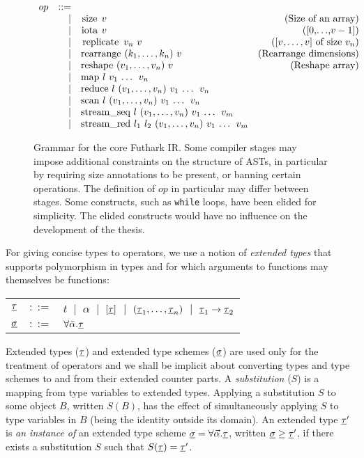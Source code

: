 \begin{figure*}[bt]
$$\begin{array}{lrlr}
    \\
    op & ::= \\
      & | & \mbox{\lstinline{size} $v$} & \mbox{(Size of an array)}\\
      & | & \mbox{\lstinline{iota} $v$} & \mbox{([0,$\ldots$,$v-1$])}\\
      & | & \mbox{\lstinline{replicate} $v_{n}$ $v$} &  \mbox{([$v,\ldots,v$] of size $v_{n}$)}\\
      & | & \mbox{\lstinline{rearrange} ($k_{1},\ldots,k_{n}$) $v$} &  \mbox{(Rearrange dimensions)}\\
      & | & \mbox{\lstinline{reshape} ($v_{1},\ldots,v_{n}$) $v$} &  \mbox{(Reshape array)}\\
      & | & \mbox{\lstinline{map} $l$ $v_{1}$ \ldots{} $v_{n}$} \\
      & | & \mbox{\lstinline{reduce} $l$ ($v_{1},\ldots,v_{n}$) $v_1$ \ldots{} $v_n$} \\
      & | & \mbox{\lstinline{scan} $l$ ($v_{1},\ldots,v_{n}$) $v_1$ \ldots{} $v_n$} \\
      & | & \mbox{\lstinline{stream_seq} $l$ ($v_{1},\ldots,v_{n}$) $v_1$ \ldots{} $v_m$} \\
      & | & \mbox{\lstinline!stream_red! $l_{1}$ $l_{2}$ ($v_{1},\ldots,v_{n}$) $v_1$ \ldots{} $v_m$}
  \end{array}
  $$
  \caption{Grammar for the core Futhark IR.  Some compiler stages may
    impose additional constraints on the structure of ASTs, in
    particular by requiring size annotations to be present, or banning
    certain operations.  The definition of $op$ in particular may
    differ between stages.  Some constructs, such as \lstinline{while}
    loops, have been elided for simplicity.  The elided constructs
    would have no influence on the development of the thesis.  }
  \label{fig:core-futhark-syntax}
\end{figure*}

For giving concise types to operators, we use a notion of \emph{extended
types} that supports polymorphism in types and for which arguments to
functions may themselves be functions:

\begin{tabular}{lrl}
$\underline{\tau}$ & $::=$ & $t$ $~|~$ $\alpha$ $~|~$ $[\underline{\tau}]$ $~|~$ $(\underline{\tau}_1, \ldots, \underline{\tau}_n)$ $~|~$ $\underline{\tau}_1 \rightarrow \underline{\tau}_2$ \\
$\underline{\sigma}$ & $::=$ & $\forall\bar{\alpha}.\underline{\tau}$
\end{tabular}

\noindent Extended types ($\underline{\tau}$) and extended type schemes
($\underline{\sigma}$) are used only for the treatment of operators and we
shall be implicit about converting types and type schemes to and from
their extended counter parts. A \emph{substitution} ($S$) is a mapping
from type variables to extended types. Applying a substitution $S$ to
some object $B$, written $S(B)$, has the effect of simultaneously
applying $S$ to type variables in $B$ (being the identity outside its
domain). An extended type $\underline{\tau}'$ is \emph{an instance of} an extended
type scheme $\underline{\sigma} = \forall \vec{\alpha}.\underline{\tau}$, written $\underline{\sigma}
\geq \underline{\tau}'$, if there exists a substitution $S$ such that $S(\underline{\tau}) =
\underline{\tau}'$.

